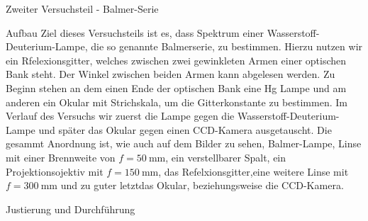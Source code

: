 \documentclass[pdftex, a4paper,11pt, twoside, ngerman]{report}
\begin{document}
  \begin{chapter}{Zweiter Versuchsteil - Balmer-Serie}
    \label{chp:Balmer}
  
  
    \begin{section}{Aufbau}
      \label{chp:Balmer:sec:Aufbau}
      Ziel dieses Versuchsteils ist es, dass Spektrum einer 
      Wasserstoff-Deuterium-Lampe, die so genannte Balmerserie, zu bestimmen.
      Hierzu nutzen wir ein Rfelexionsgitter, welches zwischen zwei gewinkleten
      Armen einer optischen Bank steht. Der Winkel zwischen beiden Armen kann 
      abgelesen werden. Zu Beginn stehen an dem einen Ende der optischen Bank 
      eine Hg Lampe und am anderen ein Okular mit Strichskala, um die 
      Gitterkonstante zu bestimmen. Im Verlauf des Versuchs wir zuerst die 
      Lampe gegen die Wasserstoff-Deuterium-Lampe und später das Okular gegen 
      einen CCD-Kamera ausgetauscht. Die gesammt Anordnung ist, wie auch auf 
      dem Bilder zu sehen, Balmer-Lampe, Linse mit einer Brennweite von 
      $f=\SI{50}{\milli\meter}$, ein verstellbarer Spalt, ein 
      Projektionsojektiv mit $f=\SI{150}{\milli\meter}$, das 
      Refelxionsgitter,eine weitere Linse mit $f=\SI{300}{\milli\meter}$ und 
      zu guter letztdas Okular, beziehungsweise die CCD-Kamera.

    \end{section}
    
    
    
    \begin{section}{Justierung und Durchführung}
      \label{chp:Balmer:sec:JusitierungDurchfuehrung}
      
      
      

\end{section}
\end{chapter}
\end{document}
